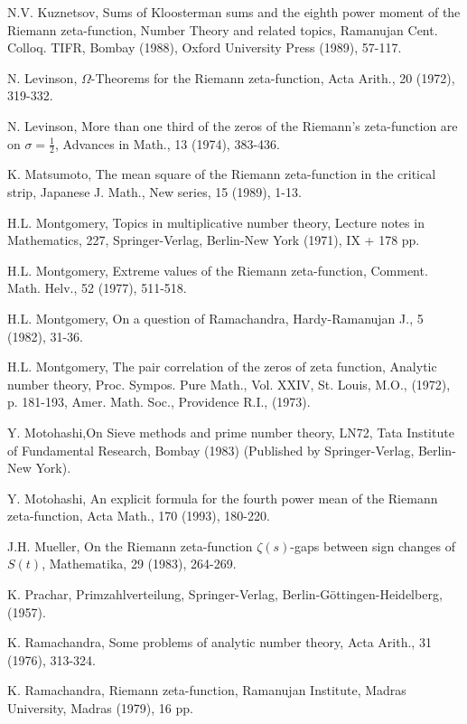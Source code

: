 \begin{thebibliography}{99}
 N.V. Kuznetsov, Sums of Kloosterman sums and the eighth power moment of the Riemann zeta-function, Number Theory and related topics, Ramanujan Cent. Colloq. TIFR, Bombay (1988), Oxford University Press (1989),  57-117.

 N. Levinson, $\Omega$-Theorems for the Riemann zeta-function, Acta Arith., 20 (1972), 319-332.

 N. Levinson, More than one third of the zeros of the Riemann's zeta-function are on $\sigma =\frac{1}{2}$, Advances in Math., 13 (1974), 383-436.

 K. Matsumoto, The mean square of the Riemann zeta-function in the critical strip, Japanese J. Math., New series, 15 (1989), 1-13.

 H.L. Montgomery, Topics in multiplicative number theory, Lecture notes in Mathematics, 227, Springer-Verlag, Berlin-New York (1971), IX + 178 pp.

 H.L. Montgomery, Extreme values of the Riemann zeta-function, Comment. Math. Helv., 52 (1977), 511-518.

 H.L. Montgomery, On a question of Ramachandra, Hardy-Ramanujan J., 5 (1982), 31-36.

 H.L. Montgomery, The pair correlation of the zeros of zeta function, Analytic number theory, Proc. Sympos. Pure Math., Vol. XXIV, St. Louis, M.O., (1972), p. 181-193, Amer. Math. Soc., Providence R.I., (1973).

 Y. Motohashi,\pageoriginale On Sieve methods and prime number theory, LN72, Tata Institute of Fundamental Research, Bombay (1983) (Published by Springer-Verlag, Berlin-New York).

 Y. Motohashi, An explicit formula for the fourth power mean of the Riemann zeta-function, Acta Math., 170 (1993), 180-220.

 J.H. Mueller, On the Riemann zeta-function $\zeta(s)$-gaps between sign changes of $S(t)$, Mathematika, 29 (1983), 264-269.

 K. Prachar, Primzahlverteilung, Springer-Verlag, Berlin-G\"ottingen-Heidelberg, (1957).

 K. Ramachandra, Some problems of analytic number theory, Acta Arith., 31 (1976), 313-324.

 K. Ramachandra, Riemann zeta-function, Ramanujan Institute, Madras University, Madras (1979), 16 pp.


\end{thebibliography}
